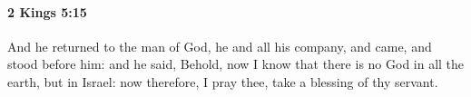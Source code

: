 
		\paragraph{2 Kings 5:15} %
			\label{2KINGS-5-15}

			And he returned to the man of God, he and all his company, and came, and stood before him: and he said, Behold, now I know that there is no God in all the earth, but in Israel: now therefore, I pray thee, take a blessing of thy servant.


